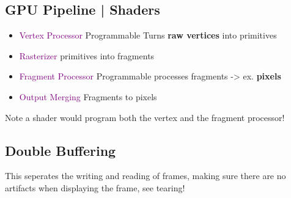 \documentclass[main.tex,fontsize=12pt,paper=a4,paper=landscape,DIV=calc,]{scrartcl}
\begin{document}
\begin{multicols*}{4}
\section{GPU Pipeline | Shaders}
\begin{itemize}
\item \textcolor{purple}{Vertex Processor} Programmable\newline
  Turns \textbf{raw vertices} into primitives
\item \textcolor{purple}{Rasterizer} primitives into fragments
\item \textcolor{purple}{Fragment Processor} Programmable \newline
  processes fragments -> ex. \textbf{pixels}
\item \textcolor{purple}{Output Merging} Fragments to pixels
\end{itemize}
Note a shader would program both the vertex and the fragment processor!

\subsection{Double Buffering}
This seperates the writing and reading of frames, making sure there are no artifacts when displaying the frame, see tearing!


\end{multicols*}
\end{document}
